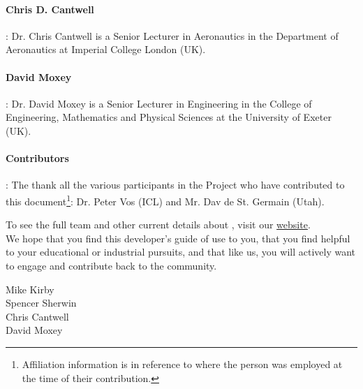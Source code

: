 \paragraph{Chris D. Cantwell}: Dr. Chris Cantwell is a Senior Lecturer in Aeronautics in the Department of Aeronautics at Imperial College London (UK).

\paragraph{David Moxey}: Dr. David Moxey is a Senior Lecturer in Engineering in the College of Engineering, Mathematics and Physical Sciences
at the University of Exeter (UK).

\paragraph{Contributors}:  The thank all the various participants in the \nek{} Project who have contributed to this document\footnote{Affiliation information is in reference to where the person was employed at the time of their contribution.}:  Dr. Peter Vos (ICL) and Mr. Dav de St. Germain (Utah).

To see the full team and other current details about \nek{}, visit our \href{http://www.nektar.info}{website}. \\

 We hope that you find this developer's guide of 
use to you, that you find \nek{} helpful to your educational or industrial pursuits, and that like us, you will actively want to engage and contribute
back  to the \nek{} community.

Mike Kirby \\
Spencer Sherwin \\
Chris Cantwell \\
David Moxey \\


  